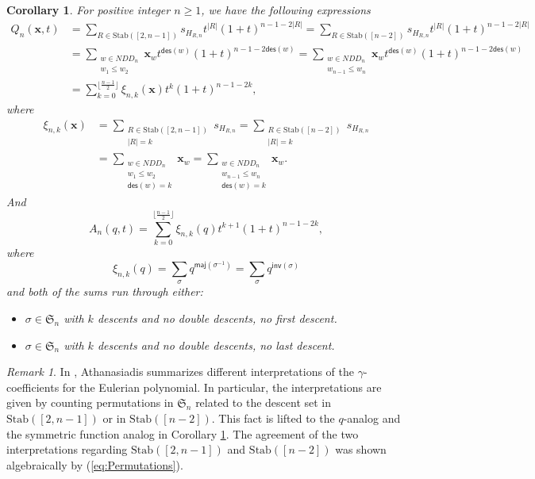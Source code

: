 \documentclass[reqno]{amsart}
\newcommand{\des}{{\mathsf{des}}}
\newcommand{\inv}{{\mathsf{inv}}}
\newcommand{\maj}{{\mathsf{maj}}}
\newcommand{\Stab}{{\mathrm{Stab}}}
\renewcommand{\S}{{\mathfrak{S}}}
\newcommand{\x}{{\mathbf{x}}}
\newtheorem{cor}[thm]{Corollary}
\theoremstyle{definition}
\theoremstyle{remark}
\newtheorem{rem}{Remark}[section]
\begin{document}
\begin{cor} \label{cor:Permutations}
For positive integer $n\ge 1$, we have the following expressions
\begin{align*}
    Q_n(\x,t)
    &=\sum_{R\in\Stab([2,n-1])}s_{H_{R,n}}t^{|R|}(1+t)^{n-1-2|R|}=\sum_{R\in\Stab([n-2])}s_{H_{R,n}}t^{|R|}(1+t)^{n-1-2|R|}\\
    &=\sum_{\substack{w\in NDD_n\\ w_1\le w_2}}\x_w t^{\des(w)}(1+t)^{n-1-2\des(w)}=\sum_{\substack{w\in NDD_n\\ w_{n-1}\le w_n}}\x_w t^{\des(w)}(1+t)^{n-1-2\des(w)}\\
    &=\sum_{k=0}^{\lfloor\frac{n-1}{2}\rfloor}\xi_{n,k}(\x) t^{k}(1+t)^{n-1-2k},
\end{align*}
where 
\begin{align*}
    \xi_{n,k}(\x)
    &=\sum_{\substack{R\in\Stab([2,n-1])\\ |R|=k}}s_{H_{R,n}}
    =\sum_{\substack{R\in\Stab([n-2])\\ |R|=k}}s_{H_{R,n}}\\
    &=\sum_{\substack{w\in NDD_n\\ w_{1}\le w_2\\ \des(w)=k}}\x_w
    =\sum_{\substack{w\in NDD_n\\ w_{n-1}\le w_n\\ \des(w)=k}}\x_w.
\end{align*}
And 
\[
    A_n(q,t)=\sum_{k=0}^{\lfloor\frac{n-1}{2}\rfloor}\xi_{n,k}(q)t^{k+1}(1+t)^{n-1-2k},
\]
where 
\[
    \xi_{n,k}(q)=\sum_{\sigma}q^{\maj(\sigma^{-1})}=\sum_{\sigma}q^{\inv(\sigma)}
\]
and both of the sums run through either:
\begin{itemize}
    \item $\sigma\in\S_n$ with $k$ descents and no double descents, no first descent.
    \item $\sigma\in\S_n$ with $k$ descents and no double descents, no last descent.
\end{itemize}
\end{cor}

\begin{rem}
In \cite[Theorem 2.1]{AthanasiadisGamma}, Athanasiadis summarizes different interpretations of the $\gamma$-coefficients for the Eulerian polynomial. In particular, the interpretations are given by counting permutations in $\S_n$ related to the descent set in $\Stab([2,n-1])$ or in $\Stab([n-2])$. This fact is lifted to the $q$-analog and the symmetric function analog in Corollary \ref{cor:Permutations}. The agreement of the two interpretations regarding $\Stab([2,n-1])$ and $\Stab([n-2])$ was shown algebraically by (\ref{eq:Permutations}).   
\end{rem}
\end{document}
